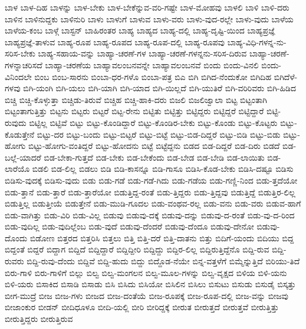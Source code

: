 {ಬಾಳ
ಬಾಳ-ದಿಹ
ಬಾಳನ್ನು
ಬಾಳ-ಬೇಕು
ಬಾಳ-ಬೇಕೆನ್ನುವ-ವರಿ-ಗಷ್ಟೇ
ಬಾಳ-ಮೋಹವು
ಬಾಳಲಿ
ಬಾಳಿ
ಬಾಳಿ-ದರು
ಬಾಳಿನ
ಬಾಳಿನುದ್ದಕು
ಬಾಳಿನುರಿ
ಬಾಳು
ಬಾಳುಗೆ
ಬಾಳುವ
ಬಾಳು-ವರು
ಬಾಳು-ವುದ-ರಲ್ಲೇ
ಬಾಳು-ವುದು
ಬಾಳೆಯ
ಬಾಳೆಯ-ಕಂಬ
ಬಾಳ್ಗೆ
ಬಾಸ್ಟನ್
ಬಾಹಿರಂತರ
ಬಾಹ್ಯ
ಬಾಹ್ಯದ
ಬಾಹ್ಯ-ದಲ್ಲಿ
ಬಾಹ್ಯ-ದೃಷ್ಟಿ-ಯಿಂದ
ಬಾಹ್ಯಪ್ರಜ್ಞೆ
ಬಾಹ್ಯಪ್ರಜ್ಞೆ-ತಾಳುವ
ಬಾಹ್ಯ-ರೂಪ
ಬಾಹ್ಯ-ರೂಪದ
ಬಾಹ್ಯ-ರೂಪ-ದಲ್ಲಿ
ಬಾಹ್ಯ-ರೂಪವು
ಬಾಹ್ಯ-ವಿಧಿ-ಗಳನ್ನ-ನು-ಸರಿಸ-ಬೇಕು
ಬಾಹ್ಯ-ಸಹಾಯ-ವನ್ನು
ಬಾಹ್ಯಾ-ಚರಣೆ-ಗಳ
ಬಾಹ್ಯಾ-ಚರಣೆ-ಗಳನ್ನನು-ಸರಿಸ-ದಿರುವ
ಬಾಹ್ಯಾ-ಚರಣೆ-ಗಳನ್ನಾಚರಿಸದೆ
ಬಾಹ್ಯಾ-ಚರಣೆಯ
ಬಾಹ್ಯಾವಲಂಬನವನ್ನೇ
ಬಾಹ್ಯಾವಲಂಬನವೆ
ಬಿಂದು
ಬಿಂದು-ವಿನಲಿ
ಬಿಂದು-ವಿನಿಂದಲೇ
ಬಿಂಬ
ಬಿಂಬ-ಸಾರನು
ಬಿಂಬಾ-ಧರ-ಗಳೊ
ಬಿಂಬಾ-ಪತ್ರ
ಬಿಎ
ಬಿಗಿ
ಬಿಗಿದ-ನೆಂದುಕೋ
ಬಿಗಿದಿಹ
ಬಿಗಿದೆಳೆ-ಗಳವು
ಬಿಗಿ-ಯಂಗಿ
ಬಿಗಿ-ಯಲು
ಬಿಗಿ-ಯಾಗಿ
ಬಿಗಿ-ಯಾದ
ಬಿಗಿ-ಯಿಲ್ಲದೆ
ಬಿಗಿ-ಯುತಿರೆ
ಬಿಗಿ-ವರಿರಿವರು
ಬಿಗಿ-ಹಿಡಿದ
ಬಿಚ್ಚಿ
ಬಿಚ್ಚಿ-ಕೊಳ್ಳುತ್ತಾ
ಬಿಚ್ಚಿಡು-ತಿರುವೆ
ಬಿಚ್ಚಿಹ
ಬಿಚ್ಚಿ-ಹಾಕಿ-ದರು
ಬಿಜಲಿ
ಬಿಜಲಿಜ್ವಾಲಾ
ಬಿಟ್ಟ
ಬಿಟ್ಟಂತಾಗಿ
ಬಿಟ್ಟಂತಾಗುತ್ತಿತ್ತು
ಬಿಟ್ಟನು
ಬಿಟ್ಟರು
ಬಿಟ್ಟರೆ
ಬಿಟ್ಟ-ರೇನು
ಬಿಟ್ಟಿತು
ಬಿಟ್ಟಿತ್ತು
ಬಿಟ್ಟಿದ್ದರು
ಬಿಟ್ಟಿದ್ದರೆ
ಬಿಟ್ಟಿದ್ದಾರೆ
ಬಿಟ್ಟಿ-ರುವುದು
ಬಿಟ್ಟಿಲ್ಲ
ಬಿಟ್ಟಿವೆ
ಬಿಟ್ಟು
ಬಿಟ್ಟು-ಕೊಂಡಿದ್ದಾರೆ
ಬಿಟ್ಟು-ಕೊಂಡಿರ-ಬೇಕು
ಬಿಟ್ಟು-ಕೊಂಡು
ಬಿಟ್ಟು-ಕೊಟ್ಟರು
ಬಿಟ್ಟು-ಕೊಡುತ್ತೇನೆ
ಬಿಟ್ಟು-ದರ
ಬಿಟ್ಟು-ಬಂದು
ಬಿಟ್ಟು-ಬಿಟ್ಟರೆ
ಬಿಟ್ಟು-ಬಿಟ್ಟೆ
ಬಿಟ್ಟು-ಬಿಡ-ದಿದ್ದರೆ
ಬಿಟ್ಟು-ಬಿಡಿ
ಬಿಟ್ಟು-ಬಿಡು
ಬಿಟ್ಟು-ಹೋಗು
ಬಿಟ್ಟು-ಹೋಗು-ವಂತಿದ್ದರೆ
ಬಿಟ್ಟು-ಹೋದನು
ಬಿಟ್ಟೆ
ಬಿಟ್ಟೆದ್ದನು
ಬಿಡದ
ಬಿಡ-ದಿದ್ದರೆ
ಬಿಡ-ದಿರು
ಬಿಡದೆ
ಬಿಡ-ಬಲ್ಲೆ-ಯಾದರೆ
ಬಿಡ-ಬೇಕಾ-ಗುತ್ತದೆ
ಬಿಡ-ಬೇಕು
ಬಿಡ-ಬೇಕೆಂದು
ಬಿಡ-ಬೇಡ
ಬಿಡ-ಬೇಡಿ
ಬಿಡ-ಲಾಯಿತು
ಬಿಡ-ಲಾರೆಯೊ
ಬಿಡಲಿ
ಬಿಡ-ಲಿಲ್ಲ
ಬಿಡಲು
ಬಿಡಿ
ಬಿಡಿ-ಕಾಸನ್ನೂ
ಬಿಡಿ-ಗಾಸೂ
ಬಿಡಿಸಿ-ಕೊಡ-ಬೇಕು
ಬಿಡಿಸಿ-ದಷ್ಟೂ
ಬಿಡಿಸು
ಬಿಡಿಸು-ವುದಕ್ಕೆ
ಬಿಡಿಸು-ವುದು
ಬಿಡು
ಬಿಡು-ಗಡೆ
ಬಿಡು-ಗಡೆ-ಗಿದು
ಬಿಡು-ಗಡೆಯ
ಬಿಡು-ಗಣ್ಣಿ-ನಿಂದ
ಬಿಡು-ತ್ತದೆಯೋ
ಬಿಡು-ತ್ತಾನೆ
ಬಿಡು-ತ್ತಾರೆ
ಬಿಡು-ತ್ತಾರೆಯೋ
ಬಿಡುತ್ತಿದ್ದ-ರಂತೆ
ಬಿಡು-ತ್ತಿದ್ದರು
ಬಿಡು-ತ್ತಿದ್ದವು
ಬಿಡುತ್ತಿದ್ದೆ
ಬಿಡುತ್ತಿರ-ಲಿಲ್ಲ
ಬಿಡುತ್ತಿಲ್ಲ
ಬಿಡುತ್ತೀಯೆ
ಬಿಡುತ್ತೇನೆ
ಬಿಡು-ಮುಡಿ-ಗೂದಲ
ಬಿಡು-ವಂಥವ-ರಲ್ಲ
ಬಿಡು-ವನು
ಬಿಡು-ವರು
ಬಿಡುವ-ಹಾಗೆ
ಬಿಡು-ವಾಗಿತ್ತು
ಬಿಡು-ವಿರಿ
ಬಿಡು-ವಿಲ್ಲ
ಬಿಡುವು
ಬಿಡುವು-ದಕ್ಕೆ
ಬಿಡುವು-ದನ್ನು
ಬಿಡುವು-ದ-ರಂತೆ
ಬಿಡು-ವು-ದ-ರಿಂದ
ಬಿಡು-ವುದಿಲ್ಲ
ಬಿಡು-ವುದಿಲ್ಲೆಂಬ
ಬಿಡು-ವುದೆ
ಬಿಡುವು-ದೆಂದರೆ
ಬಿಡುವು-ದೆಂದೂ
ಬಿಡುವು-ದೇನೋ
ಬಿಡುವು-ದೊಂದು
ಬಿಡೋಣ
ಬಿತ್ತರದ
ಬಿತ್ತರಿಸಿ
ಬಿತ್ತಲು
ಬಿತ್ತಿ
ಬಿತ್ತಿ-ದರೆ
ಬಿತ್ತಿ-ದಾತನು
ಬಿತ್ತು
ಬಿದಿಗೆ-ಯಂದು
ಬಿದಿಯು
ಬಿದ್ದ
ಬಿದ್ದಂತೆ
ಬಿದ್ದರೆ
ಬಿದ್ದಾಗ
ಬಿದ್ದಿದೆ
ಬಿದ್ದಿದ್ದಾರೆ
ಬಿದ್ದಿದ್ದೀರಿ
ಬಿದ್ದಿದ್ದು
ಬಿದ್ದಿರ-ಲಿಲ್ಲ
ಬಿದ್ದಿರುತ್ತಿದ್ದೆನೊ
ಬಿದ್ದಿ-ರುವ
ಬಿದ್ದಿ-ರುವರು
ಬಿದ್ದಿ-ರುವು-ದೆಂದು
ಬಿದ್ದಿವೆ
ಬಿದ್ದಿ-ಹುದು
ಬಿದ್ದು
ಬಿದ್ದೊಡ-ನೆಯೇ
ಬಿನ್ನ-ವತ್ತಳೆಗೆ
ಬಿಮ್ಮೆನ್ನುತ್ತಿದೆ
ಬಿರಿಯು-ತಿದೆ
ಬಿರು-ಗಾಳಿ
ಬಿರು-ಗಾಳಿಗೆ
ಬಿಲ್ಲು
ಬಿಲ್ವ
ಬಿಲ್ವ-ಮಂಗಲನ
ಬಿಲ್ವ-ಮೂಲ-ಗಳನ್ನು
ಬಿಲ್ವ-ವೃಕ್ಷದ
ಬಿಳಿಯ
ಬಿಳಿ-ಯನು
ಬಿಳಿ-ಯರು
ಬಿಸಾಕಿದ
ಬಿಸಾಡಿ
ಬಿಸಾಡು
ಬಿಸಿ
ಬಿಸಿದು
ಬಿಸಿಯೋ
ಬಿಸಿಲಿನ
ಬಿಸಿಲು
ಬಿಸುಟು
ಬಿಸುಡು
ಬಿಸುಡೈ
ಬಿಸ್ಕತ್ತು
ಬೀಗ-ಮುದ್ರೆ
ಬೀಜ
ಬೀಜ-ಗಳು
ಬೀಜದ
ಬೀಜ-ದಂತೆಯೆ
ಬೀಜ-ರೂಪಕ್ಕೆ
ಬೀಜ-ರೂಪ-ದಲ್ಲಿ
ಬೀಜ-ವನ್ನು
ಬೀಜವು
ಬೀಜಾಂಕುರ
ಬೀಡನ್
ಬೀದಿಧೂಳೂ
ಬೀದಿ-ಯಲ್ಲಿ
ಬೀರಿ
ಬೀರಿದ್ದಕ್ಕೆ
ಬೀರುತ
ಬೀರುತ್ತದೆ
ಬೀರುತ್ತವೆ
ಬೀರುತ್ತಿತ್ತು
ಬೀರುತ್ತಿದ್ದರು
ಬೀರುತ್ತಿರುವ
}
